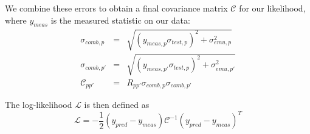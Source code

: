\documentclass[12pt]{article}
\begin{document}
We combine these errors to obtain a final covariance matrix $\mathcal{C}$ for our likelihood, where $y_{meas}$ is the measured statistic on our data:
\begin{eqnarray}
\sigma_{comb,p} &=& \sqrt{ (y_{meas, p} \sigma_{test,p})^2 + \sigma_{emu,p}^2} \\
\sigma_{comb,p'} &=& \sqrt{ (y_{meas, p'} \sigma_{test,p})^2 + \sigma_{emu,p'}^2} \\
\mathcal{C}_{pp'} &=& R_{pp'} \sigma_{comb,p} \sigma_{comb,p'}
\end{eqnarray}

The log-likelihood $\mathcal{L}$ is then defined as 
\begin{equation}
    \mathcal{L} = -\frac{1}{2} (y_{pred} - y_{meas}) \mathcal{C}^{-1} (y_{pred} - y_{meas})^T
\end{equation}
\end{document}
